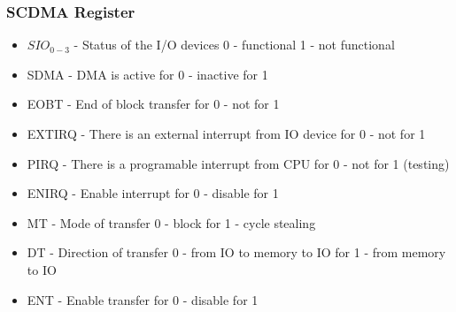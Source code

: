 \begin{frame}
    \frametitle{SCDMA Register}
    \begin{table}[]
    \end{table}
    \begin{itemize}
        \item $SIO_{0-3}$ - Status of the I/O devices 0 - functional 1 - not functional
        \item SDMA - DMA is active for 0 - inactive for 1
        \item EOBT - End of block transfer for 0 - not for 1
        \item EXTIRQ - There is an external interrupt from IO device for 0 - not for 1
        \item PIRQ - There is a programable interrupt from CPU for 0 - not for 1 (testing)
        \item ENIRQ - Enable interrupt for 0 - disable for 1
        \item MT - Mode of transfer 0 - block for 1 - cycle stealing
        \item DT - Direction of transfer 0 - from IO to memory to IO for 1 - from memory to IO
        \item ENT - Enable transfer for 0 - disable for 1
    \end{itemize}
    \note{
    }
\end{frame}


